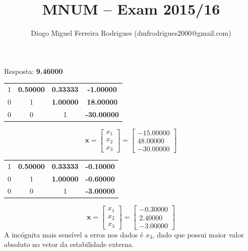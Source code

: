 \documentclass{mnum}
\title{MNUM -- Exam 2015/16}
\author{Diogo Miguel Ferreira Rodrigues (dmfrodrigues2000@gmail.com)}
\begin{document}
\setcounter{chapter}{14}


Resposta: \textbf{9.46000}



\begin{center}
    \begin{tabular}{ c c c | c}
        1 & \textbf{0.50000} & \textbf{0.33333} & \textbf{-1.00000} \\
        0 & 1 & \textbf{1.00000} & \textbf{18.00000} \\
        0 & 0 & 1 & \textbf{-30.00000}
    \end{tabular}
\end{center}
\begin{equation*}
    \mathbf{x}
    =\begin{bmatrix} x_1 \\ x_2 \\ x_3 \end{bmatrix}
    =\begin{bmatrix} -15.00000 \\ 48.00000 \\ -30.00000 \end{bmatrix}
\end{equation*}
\begin{center}
    \begin{tabular}{ c c c | c}
        1 & \textbf{0.50000} & \textbf{0.33333} & \textbf{-0.10000} \\
        0 & 1 & \textbf{1.00000} & \textbf{-0.60000} \\
        0 & 0 & 1 & \textbf{-3.00000}
    \end{tabular}
\end{center}
\begin{equation*}
    \mathbf{x}
    =\begin{bmatrix} x_1 \\ x_2 \\ x_3 \end{bmatrix}
    =\begin{bmatrix} -0.30000 \\ 2.40000 \\ -3.00000 \end{bmatrix}
\end{equation*}
A incógnita mais sensível a erros nos dados é $x_3$, dado que possui maior valor absoluto no vetor da estabilidade externa.
\end{document}
